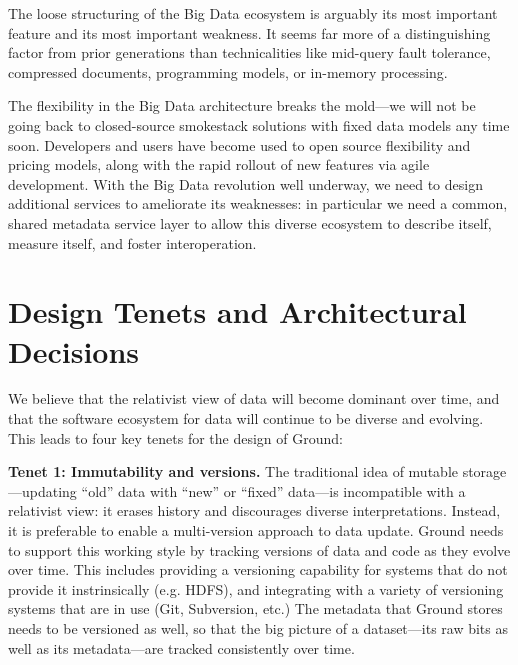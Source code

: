 \documentclass[10pt,letterpaper]{article}
\begin{document}
The loose structuring of the Big Data ecosystem is arguably its most important feature and its most important weakness.  It seems far more of a distinguishing factor from prior generations than technicalities like mid-query fault tolerance, compressed documents, programming models, or in-memory processing. 

The flexibility in the Big Data architecture breaks the mold---we will not be going back to closed-source smokestack solutions with fixed data models any time soon. Developers and users have become used to open source flexibility and pricing models, along with the rapid rollout of new features via agile development.  With the Big Data revolution well underway, we need to design additional services to ameliorate its weaknesses: in particular we need a common, shared metadata service layer to allow this diverse ecosystem to describe itself, measure itself, and foster interoperation.


\section{Design Tenets and Architectural Decisions}
\label{sec:designreqs}
We believe that the relativist view of data will become dominant over time, and that the software ecosystem for data will continue to be diverse and evolving.  This leads to four key tenets for the design of Ground:

\vspace{0.5em}\noindent
\textbf{Tenet 1: Immutability and versions.}  The traditional idea of mutable storage---updating ``old'' data with ``new'' or ``fixed'' data---is incompatible with a relativist view: it erases history and discourages diverse interpretations. Instead, it is preferable to enable a multi-version approach to data update.
Ground needs to support this working style by tracking versions of data and code as they evolve over time.  This includes providing a versioning capability for systems that do not provide it instrinsically (e.g. HDFS), and integrating with a variety of versioning systems that are in use (Git, Subversion, etc.)  The metadata that Ground stores needs to be versioned as well, so that the big picture of a dataset---its raw bits as well as its metadata---are tracked consistently over time.
\end{document}
